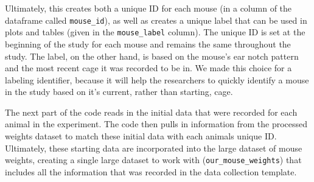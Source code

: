 \documentclass[
]{book}
\newenvironment{Shaded}{\begin{snugshade}}{\end{snugshade}}
\newcommand{\AttributeTok}[1]{\textcolor[rgb]{0.13,0.29,0.53}{#1}}
\newcommand{\CommentTok}[1]{\textcolor[rgb]{0.56,0.35,0.01}{\textit{#1}}}
\newcommand{\FunctionTok}[1]{\textcolor[rgb]{0.13,0.29,0.53}{\textbf{#1}}}
\newcommand{\NormalTok}[1]{#1}
\newcommand{\OtherTok}[1]{\textcolor[rgb]{0.56,0.35,0.01}{#1}}
\newcommand{\SpecialCharTok}[1]{\textcolor[rgb]{0.81,0.36,0.00}{\textbf{#1}}}
\newcommand{\StringTok}[1]{\textcolor[rgb]{0.31,0.60,0.02}{#1}}
\begin{document}
\begin{Shaded}
\end{Shaded}

Ultimately, this creates both a unique ID for each mouse (in a column of the
dataframe called \texttt{mouse\_id}), as well as creates a unique label that can be used
in plots and tables (given in the \texttt{mouse\_label} column). The unique ID is set at
the beginning of the study for each mouse and remains the same throughout the
study. The label, on the other hand, is based on the mouse's ear notch pattern
and the most recent cage it was recorded to be in. We made this choice for a
labeling identifier, because it will help the researchers to quickly identify a
mouse in the study based on it's current, rather than starting, cage.

The next part of the code reads in the initial data that were recorded for each
animal in the experiment. The code then pulls in information from the processed
weights dataset to match these initial data with each animals unique ID.
Ultimately, these starting data are incorporated into the large dataset of mouse
weights, creating a single large dataset to work with (\texttt{our\_mouse\_weights}) that
includes all the information that was recorded in the data collection template.
\end{document}
